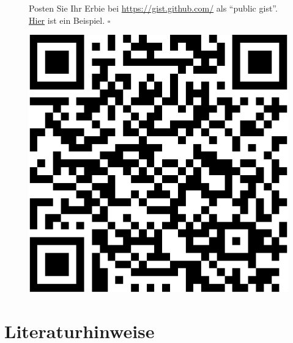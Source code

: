 \documentclass[
  letterpaper,
  oneside,
  open=any]{scrbook}
\theoremstyle{definition}
\theoremstyle{definition}
\theoremstyle{definition}
\theoremstyle{remark}
\begin{document}
\begin{tcolorbox}[enhanced jigsaw, bottomrule=.15mm, left=2mm, colbacktitle=quarto-callout-tip-color!10!white, bottomtitle=1mm, colframe=quarto-callout-tip-color-frame, coltitle=black, rightrule=.15mm, breakable, toptitle=1mm, titlerule=0mm, title=\textcolor{quarto-callout-tip-color}{\faLightbulb}\hspace{0.5em}{Tipp}, opacitybacktitle=0.6, arc=.35mm, colback=white, leftrule=.75mm, opacityback=0, toprule=.15mm]

\begin{figure}[H]

\begin{minipage}{0.80\linewidth}
Posten Sie Ihr Erbie bei \url{https://gist.github.com/} als
\enquote{public gist}.
\href{https://gist.github.com/sebastiansauer/0649a0453b5cc7c6a1d16ac760667215}{Hier}
ist ein Beispiel. \(\square\)\end{minipage}%
%
\begin{minipage}{0.20\linewidth}

\begin{center}
\includegraphics[width=0.75\linewidth,height=\textheight,keepaspectratio]{030-aufbereiten_files/figure-pdf/unnamed-chunk-49-1.pdf}
\end{center}

\end{minipage}%

\end{figure}%

\end{tcolorbox}

\section{Literaturhinweise}\label{literaturhinweise-2}
\end{document}
